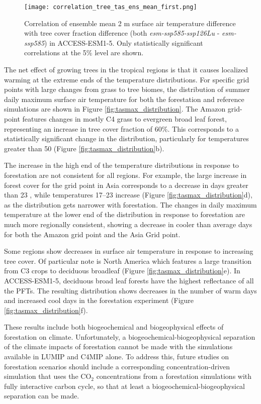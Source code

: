 \documentclass[draft]{agujournal2019}
\begin{document}
\begin{figure}
    \texttt{[image: correlation\_tree\_tas\_ens\_mean\_first.png]}
    \caption{Correlation of ensemble mean 2 m surface air temperature difference with tree cover fraction difference (both \textit{esm-ssp585-ssp126Lu} - \textit{esm-ssp585}) in ACCESS-ESM1-5. Only statistically significant correlations at the 5\% level are shown.}
    \label{fig:map_tas_tree_correlation}
\end{figure}

The net effect of growing trees in the tropical regions is that it causes localized warming at the extreme ends of the temperature distributions.
For specific grid points with large changes from grass to tree biomes, the distribution of summer daily maximum surface air temperature for both the forestation and reference simulations are shown in Figure \ref{fig:tasmax_distribution}.
The Amazon grid-point features changes in mostly C4 grass to evergreen broad leaf forest, representing an increase in tree cover fraction of 60\%.
This corresponds to a statistically significant change in the distribution, particularly for temperatures greater than 50 \textcelsius{} (Figure \ref{fig:tasmax_distribution}b).

The increase in the high end of the temperature distributions in response to forestation are not consistent for all regions.
For example, the large increase in forest cover for the grid point in Asia corresponds to a decrease in days greater than 23 \textcelsius{}, while temperatures 17--23 \textcelsius{} increase (Figure \ref{fig:tasmax_distribution}d), as the distribution gets narrower with forestation.
The changes in daily maximum temperature at the lower end of the distribution in response to forestation are much more regionally consistent, showing a decrease in cooler than average days for both the Amazon grid point and the Asia Grid point.

Some regions show decreases in surface air temperature in response to increasing tree cover.
Of particular note is North America which features a large transition from C3 crops to deciduous broadleaf (Figure \ref{fig:tasmax_distribution}e).
In ACCESS-ESM1-5, deciduous broad leaf forests have the highest reflectance of all the PFTs.
The resulting distribution shows decreases in the number of warm days and increased cool days in the forestation experiment (Figure \ref{fig:tasmax_distribution}f).

These results include both biogeochemical and biogeophysical effects of forestation on climate.
Unfortunately, a biogeochemical-biogeophysical separation of the climate impacts of forestation cannot be made with the simulations available in LUMIP and C4MIP alone.
To address this, future studies on forestation scenarios should include a corresponding concentration-driven simulation that uses the CO$_2$ concentrations from a forestation simulations with fully interactive carbon cycle, so that at least a biogeochemical-biogeophysical separation can be made.
\end{document}
